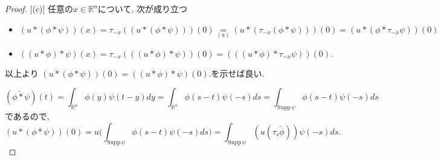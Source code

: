 \begin{proof}

[(c)] 任意の\(x \in \mathbb{R}^n\)について, 次が成り立つ
\begin{itemize}
\item \((u \ast (\phi \ast \psi))(x) 
= \tau_{-x}((u \ast (\phi \ast \psi)))(0) 
\underset{(a)}{=} (u \ast (\tau_{-x}(\phi \ast \psi)))(0)
= (u \ast (\phi\ast \tau_{-x}\psi))(0) \)
\item \( ((u \ast \phi) \ast \psi)(x) = \tau_{-x}(((u \ast \phi) \ast \psi))(0) 
= (((u \ast \phi) \ast \tau_{-x}\psi))(0).\)
\end{itemize}
以上より \((u \ast (\phi \ast \psi))(0) = ((u \ast \phi) \ast \psi)(0).\)を示せば良い.

\[
(\widetilde{\phi \ast \psi})(t) 
= \int_{\mathbb{R}^n} \phi(y) \psi(t-y) dy
= \int_{\mathbb{R}^n} \phi(s-t) \psi(-s) ds 
= \int_{\mathrm{Supp}\,\psi} \phi(s-t)\psi(-s) ds
\]
であるので, 
\begin{equation}
\label{eq-1-thm-H-2.10}
 (u \ast (\phi \ast \psi))(0) 
 = u\Big( \int_{\mathrm{Supp}\,\psi} \phi(s-t)\psi(-s) ds \Big)
 =\int_{\mathrm{Supp}\,\psi} (u(\tau_s \widetilde{\phi})) \psi(-s) ds.
\end{equation}


\end{proof}
